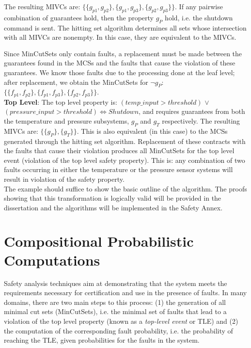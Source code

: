 The resulting MIVCs are: $\{\{g_{p1}, g_{p2}\}, \{g_{p1}, g_{p3}\}, \{g_{p2}, g_{p3}\}\}$. If any pairwise combination of guarantees hold, then the property $g_P$ hold, i.e. the shutdown command is sent. The hitting set algorithm determines all sets whose intersection with all MIVCs are nonempty. In this case, they are equivalent to the MIVCs. 

Since MinCutSets only contain faults, a replacement must be made between the guarantees found in the MCSs and the faults that cause the violation of these guarantees. We know those faults due to the processing done at the leaf level; after replacement, we obtain the MinCutSets for $\neg g_P$: $\{\{f_{p1}, f_{p2}\}, \{f_{p1}, f_{p3}\}, \{f_{p2}, f_{p3}\}\}$.\\

\textbf{Top Level}: The top level property is: $(temp\_input > threshold)$ $\lor$ $(pressure\_input > threshold) \iff Shutdown$, and requires guarantees from both the temperature and pressure subsystems, $g_P$ and $g_T$ respectively. The resulting MIVCs are: $\{\{g_P\}, \{g_T\}\}$. This is also equivalent (in this case) to the MCSs generated through the hitting set algorithm. Replacement of these contracts with the faults that cause their violation produces all MinCutSets for the top level event (violation of the top level safety property). This is: any combination of two faults occurring in either the temperature or the pressure sensor systems will result in violation of the safety property. \\

The example should suffice to show the basic outline of the algorithm. The proofs showing that this transformation is logically valid will be provided in the dissertation and the algorithms will be implemented in the Safety Annex.  


\section{Compositional Probabilistic Computations}
Safety analysis techniques aim at demonstrating that the system meets the requirements necessary for certification and use in the presence of faults. In many domains, there are two main steps to this process: (1) the generation of all minimal cut sets (MinCutSets), i.e. the minimal set of faults that lead to a violation of the top level property (known as a \textit{top-level event} or TLE) and (2) the computation of the corresponding fault probability, i.e. the probability of reaching the TLE, given probabilities for the faults in the system. 

